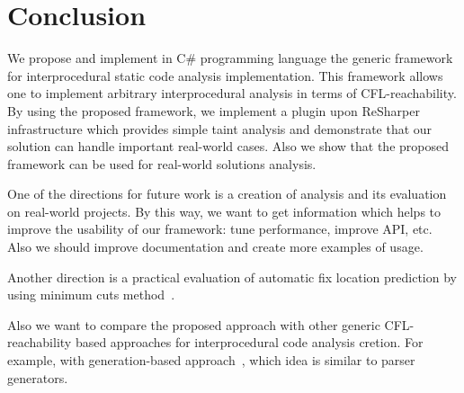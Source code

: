\section{Conclusion}

We propose and implement in C\# programming language the generic framework for interprocedural static code analysis implementation.
This framework allows one to implement arbitrary interprocedural analysis in terms of CFL-reachability.
By using the proposed framework, we implement a plugin upon ReSharper infrastructure which provides simple taint analysis and demonstrate that our solution can handle important real-world cases.
Also we show that the proposed framework can be used for real-world solutions analysis.

One of the directions for future work is a creation of analysis and its evaluation on real-world projects.
By this way, we want to get information which helps to improve the usability of our framework: tune performance, improve API, etc.
Also we should improve documentation and create more examples of usage.

Another direction is a practical evaluation of automatic fix location prediction by using minimum cuts method~\cite{10.1007/978-3-319-63390-9_27}.

Also we want to compare the proposed approach with other generic CFL-reachability based approaches for interprocedural code analysis cretion. For example, with generation-based approach~\cite{LPAR-21:Cauliflower_Solver_Generator_for}, which idea is similar to parser generators.
